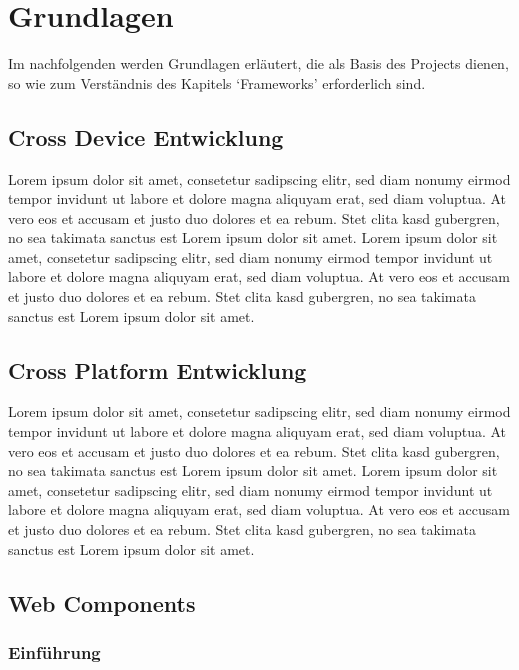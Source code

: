 
\chapter{Grundlagen}

Im nachfolgenden werden Grundlagen erläutert, die als Basis des Projects dienen, so wie zum Verständnis des Kapitels `Frameworks' erforderlich sind.


\section{Cross Device Entwicklung}
Lorem ipsum dolor sit amet, consetetur sadipscing elitr, sed diam nonumy eirmod tempor invidunt ut labore et dolore magna aliquyam erat, sed diam voluptua. At vero eos et accusam et justo duo dolores et ea rebum. Stet clita kasd gubergren, no sea takimata sanctus est Lorem ipsum dolor sit amet. Lorem ipsum dolor sit amet, consetetur sadipscing elitr, sed diam nonumy eirmod tempor invidunt ut labore et dolore magna aliquyam erat, sed diam voluptua. At vero eos et accusam et justo duo dolores et ea rebum. Stet clita kasd gubergren, no sea takimata sanctus est Lorem ipsum dolor sit amet.

\section{Cross Platform Entwicklung}
Lorem ipsum dolor sit amet, consetetur sadipscing elitr, sed diam nonumy eirmod tempor invidunt ut labore et dolore magna aliquyam erat, sed diam voluptua. At vero eos et accusam et justo duo dolores et ea rebum. Stet clita kasd gubergren, no sea takimata sanctus est Lorem ipsum dolor sit amet. Lorem ipsum dolor sit amet, consetetur sadipscing elitr, sed diam nonumy eirmod tempor invidunt ut labore et dolore magna aliquyam erat, sed diam voluptua. At vero eos et accusam et justo duo dolores et ea rebum. Stet clita kasd gubergren, no sea takimata sanctus est Lorem ipsum dolor sit amet.

\section{Web Components}

\subsection{Einführung}

